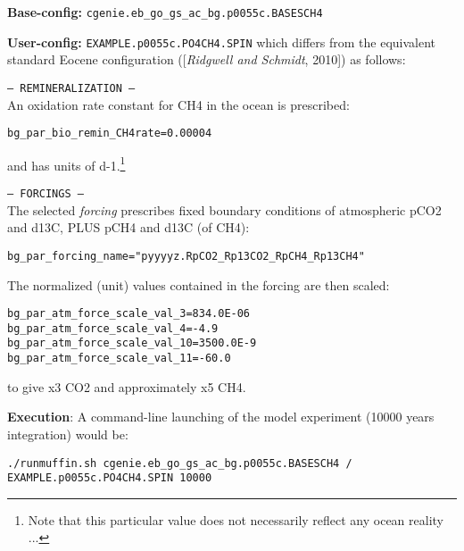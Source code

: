 \documentclass[10pt,twoside]{article}
\begin{document}
\noindent \textbf{Base-config:} \texttt{cgenie.eb\_go\_gs\_ac\_bg.p0055c.BASESCH4}

\noindent \textbf{User-config:} \texttt{EXAMPLE.p0055c.PO4CH4.SPIN} which differs from the equivalent standard Eocene configuration ([\textit{Ridgwell and Schmidt}, 2010]) as follows:
\begin{compactitem}
        \item \texttt{--- REMINERALIZATION ---}
        \\ An oxidation rate constant for CH4 in the ocean is prescribed:
\vspace{-5pt}\begin{verbatim}bg_par_bio_remin_CH4rate=0.00004\end{verbatim}\vspace{-5pt}
and has units of d-1.\footnote{Note that this particular value does not necessarily reflect any ocean reality ...}
                \item \texttt{--- FORCINGS ---}
        \\ The selected \textit{forcing} prescribes fixed boundary conditions of atmospheric pCO2 and d13C, PLUS pCH4 and d13C (of CH4):
\vspace{-5pt}\begin{verbatim}bg_par_forcing_name="pyyyyz.RpCO2_Rp13CO2_RpCH4_Rp13CH4"\end{verbatim}\vspace{-5pt}
        The normalized (unit) values contained in the forcing are then scaled:
        \vspace{-5pt}\begin{verbatim}
bg_par_atm_force_scale_val_3=834.0E-06
bg_par_atm_force_scale_val_4=-4.9
bg_par_atm_force_scale_val_10=3500.0E-9
bg_par_atm_force_scale_val_11=-60.0
                \end{verbatim}\vspace{-5pt}
to give x3 CO2 and approximately x5 CH4.
        \end{compactitem}

\noindent \textbf{Execution}: A command-line launching of the model experiment (10000 years integration) would be:
\vspace{-5pt}\begin{verbatim}./runmuffin.sh cgenie.eb_go_gs_ac_bg.p0055c.BASESCH4 /
EXAMPLE.p0055c.PO4CH4.SPIN 10000\end{verbatim}\vspace{-5pt}
\end{document}
